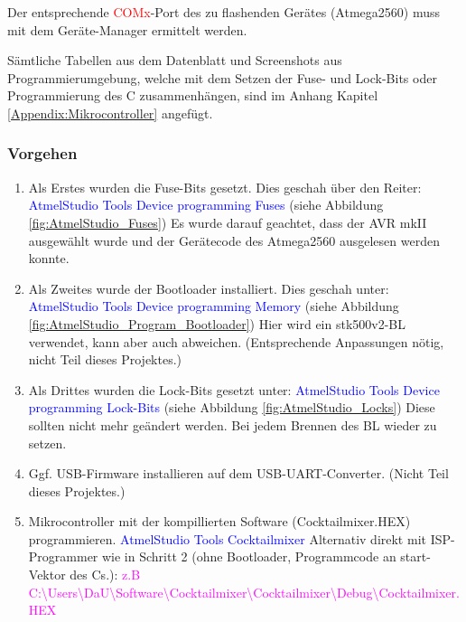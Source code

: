 Der entsprechende \textcolor{red}{ COMx}-Port des zu flashenden Gerätes (Atmega2560) muss mit dem Geräte-Manager ermittelt werden.



Sämtliche Tabellen aus dem Datenblatt und Screenshots aus Programmierumgebung, welche mit dem Setzen der Fuse- und Lock-Bits oder Programmierung des \textmu C zusammenhängen, sind im Anhang Kapitel \ref{Appendix:Mikrocontroller} angefügt.

\subsubsection{Vorgehen}\label{subsubsec:Inbetriebnahme_uC_Vorgehen}

\begin{enumerate}
\item Als Erstes wurden die Fuse-Bits gesetzt. Dies geschah über den Reiter:\newline
\textcolor{blue}{AtmelStudio \textrightarrow Tools \textrightarrow Device programming \textrightarrow Fuses} (siehe Abbildung \ref{fig:AtmelStudio_Fuses}) \newline
Es wurde darauf geachtet, dass der AVR mkII ausgewählt wurde und der Gerätecode des Atmega2560 ausgelesen werden konnte.
\newline
\item Als Zweites wurde der Bootloader installiert. Dies geschah unter:\newline
\textcolor{blue}{AtmelStudio \textrightarrow Tools \textrightarrow Device programming \textrightarrow Memory} (siehe Abbildung \ref{fig:AtmelStudio_Program_Bootloader}) \newline
Hier wird ein stk500v2-BL verwendet, kann aber auch abweichen. (Entsprechende Anpassungen nötig, nicht Teil dieses Projektes.)\newline
\item Als Drittes wurden die Lock-Bits gesetzt unter:\newline
\textcolor{blue}{AtmelStudio \textrightarrow Tools \textrightarrow Device programming \textrightarrow Lock-Bits} (siehe Abbildung \ref{fig:AtmelStudio_Locks})\newline
Diese sollten nicht mehr geändert werden. Bei jedem Brennen des BL wieder zu setzen.\newline
\item Ggf. USB-Firmware installieren auf dem USB-UART-Converter. (Nicht Teil dieses Projektes.)\newline
\item Mikrocontroller mit der kompillierten Software (Cocktailmixer.HEX) programmieren.\newline
\textcolor{blue}{AtmelStudio \textrightarrow Tools \textrightarrow Cocktailmixer}\newline
Alternativ direkt mit ISP-Programmer wie in Schritt 2 (ohne Bootloader, Programmcode an start-Vektor des \textmu Cs.):\newline
\textcolor{magenta}{z.B C:\textbackslash Users\textbackslash DaU\textbackslash Software\textbackslash Cocktailmixer\textbackslash Cocktailmixer\textbackslash Debug\textbackslash Cocktailmixer.HEX}
\end{enumerate}

